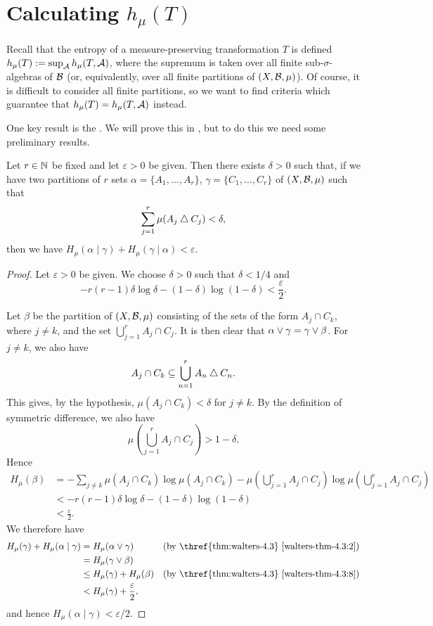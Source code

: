 \section{Calculating \texorpdfstring{$h_\mu(T)$}{h(T)}}
Recall that the entropy of a measure-preserving transformation $T$ is defined $h_\mu(T) := \sup_{\mathcal{A}}{h_\mu(T, \mathcal{A})}$, where the supremum is taken over all finite sub-$\sigma$-algebras of $\mathcal{B}$ (or, equivalently, over all finite partitions of $(X, \mathcal{B}, \mu)$). Of course, it is difficult to consider all finite partitions, so we want to find criteria which guarantee that $h_\mu(T) = h_\mu(T, \mathcal{A})$ instead.

One key result is the . We will prove this in , but to do this we need some preliminary results.

\begin{lemma} \label{lem:walters-4-15}
	Let $r \in \mathbb{N}$ be fixed and let $\varepsilon > 0$ be given. Then there exists $\delta > 0$ such that, if we have two partitions of $r$ sets $\alpha = \{A_1, \dots, A_r\}$, $\gamma = \{C_1, \dots, C_r\}$ of $(X, \mathcal{B}, \mu)$ such that
	\[
		\sum_{j = 1}^r{\mu(A_j \bigtriangleup C_j)} < \delta,
	\]
	then we have $H_\mu(\alpha \mid \gamma) + H_\mu(\gamma \mid \alpha) < \varepsilon$.
	
	\begin{proof}
		Let $\varepsilon > 0$ be given. We choose $\delta > 0$ such that $\delta < 1 / 4$ and
		\[
			-r(r - 1) \delta \log{\delta} - (1 - \delta) \log(1 - \delta) < \frac{\varepsilon}{2}.
		\]
		
		Let $\beta$ be the partition of $(X, \mathcal{B}, \mu)$ consisting of the sets of the form $A_j \cap C_k$, where $j \neq k$, and the set $\bigcup_{j = 1}^r{A_j \cap C_j}$. It is then clear that $\alpha \vee \gamma = \gamma \vee \beta$. For $j \neq k$, we also have
		\[
			A_j \cap C_k \subseteq \bigcup_{n = 1}^r{A_n \bigtriangleup C_n}.
		\]
		This gives, by the hypothesis, $\mu(A_j \cap C_k) < \delta$ for $j \neq k$. By the definition of symmetric difference, we also have
		\[
			\mu\left(\bigcup_{j = 1}^r{A_j \cap C_j}\right) > 1 - \delta.
		\]
		Hence
		\begin{align*}
			H_\mu(\beta) &= -\sum_{j \neq k}{\mu(A_j \cap C_k) \log{\mu(A_j \cap C_k)}} - \mu\left(\bigcup_{j = 1}^r{A_j \cap C_j}\right) \log{\mu\left(\bigcup_{j = 1}^r{A_j \cap C_j}\right)} \\
				&< -r(r - 1) \delta \log{\delta} - (1 - \delta) \log(1 - \delta) \\
				&< \frac{\varepsilon}{2}.
		\end{align*}
		We therefore have
		\begin{align*}
			H_\mu(\gamma) + H_\mu(\alpha \mid \gamma) &= H_\mu(\alpha \join \gamma) & \text{(by \thref{thm:walters-4.3} \ref{walters-thm-4.3:2})} \\
				&= H_\mu(\gamma \join \beta) \\
				&\leq H_\mu(\gamma) + H_\mu(\beta) & \text{(by \thref{thm:walters-4.3} \ref{walters-thm-4.3:8})} \\
				&< H_\mu(\gamma) + \frac{\varepsilon}{2},
		\end{align*}
		and hence $H_\mu(\alpha \mid \gamma) < \varepsilon / 2$.
		

\end{proof}
\end{lemma}

